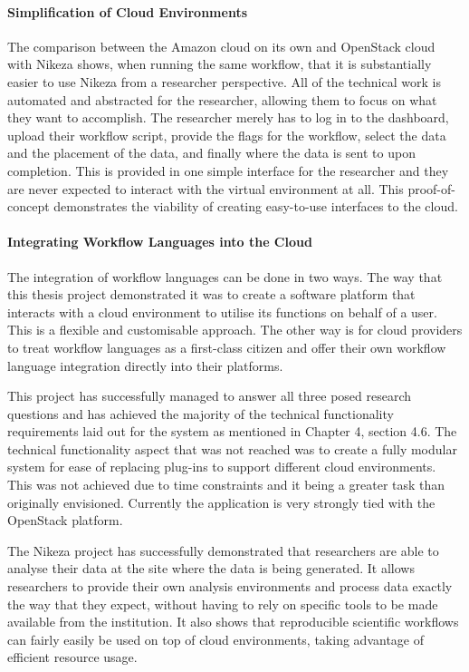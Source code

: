 \paragraph{Simplification of Cloud Environments}
The comparison between the Amazon cloud on its own and OpenStack cloud with Nikeza shows, when running the same workflow, that it is substantially easier to use Nikeza from a researcher perspective. All of the technical work is automated and abstracted for the researcher, allowing them to focus on what they want to accomplish. The researcher merely has to log in to the dashboard, upload their workflow script, provide the flags for the workflow, select the data and the placement of the data, and finally where the data is sent to upon completion. This is provided in one simple interface for the researcher and they are never expected to interact with the virtual environment at all. This proof-of-concept demonstrates the viability of creating easy-to-use interfaces to the cloud.

\paragraph{Integrating Workflow Languages into the Cloud}
The integration of workflow languages can be done in two ways. The way that this thesis project demonstrated it was to create a software platform that interacts with a cloud environment to utilise its functions on behalf of a user. This is a flexible and customisable approach. The other way is for cloud providers to treat workflow languages as a first-class citizen and offer their own workflow language integration directly into their platforms.

This project has successfully managed to answer all three posed research questions and has achieved the majority of the technical functionality requirements laid out for the system as mentioned in Chapter 4, section 4.6. The technical functionality aspect that was not reached was to create a fully modular system for ease of replacing plug-ins to support different cloud environments. This was not achieved due to time constraints and it being a greater task than originally envisioned. Currently the application is very strongly tied with the OpenStack platform.

The Nikeza project has successfully demonstrated that researchers are able to analyse their data at the site where the data is being generated. It allows researchers to provide their own analysis environments and process data exactly the way that they expect, without having to rely on specific tools to be made available from the institution. It also shows that reproducible scientific workflows can fairly easily be used on top of cloud environments, taking advantage of efficient resource usage.

